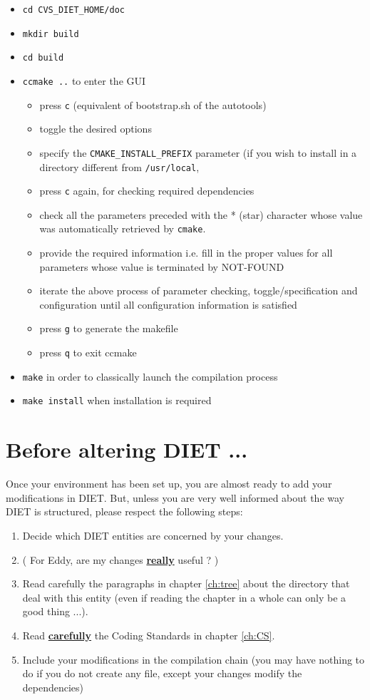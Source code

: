 \begin{itemize}
\item
  \verb+cd CVS_DIET_HOME/doc+
\item
  \verb+mkdir build+
\item
  \verb+cd build+
\item
  \verb+ccmake ..+ to enter the GUI
  \begin{itemize}
  \item press \verb+c+ (equivalent of bootstrap.sh of the autotools)
  \item toggle the desired options 
  \item specify the \verb+CMAKE_INSTALL_PREFIX+ parameter (if you wish
     to install in a directory different from \verb+/usr/local+,
  \item press \verb+c+ again, for checking required dependencies
  \item check all the parameters preceded with the * (star) character
     whose value was automatically retrieved by \verb+cmake+.
  \item provide the required information i.e. fill in the proper values
     for all parameters whose value is terminated by NOT-FOUND
  \item iterate the above process of parameter checking, toggle/specification
     and configuration until all configuration information is satisfied
  \item press \verb+g+ to generate the makefile
  \item press \verb+q+ to exit ccmake
  \end{itemize}
\item
  \verb+make+ in order to classically launch the compilation process
\item
  \verb+make install+ when installation is required
\end{itemize}


\section{Before altering DIET ...}

Once your environment has been set up, you are almost ready to add
your modifications in DIET. But, unless you are very well informed
about the way DIET is structured, please respect the following steps:
\begin{enumerate}
\item Decide which DIET entities are concerned by your changes.
\item ( For Eddy, are my changes \underline{\textbf{really}} useful ? )
\item Read carefully the paragraphs in chapter \ref{ch:tree} about the
  directory that deal with this entity (even if reading the chapter in
  a whole can only be a good thing ...).
\item Read \underline{\textbf{carefully}} the Coding Standards in
  chapter \ref{ch:CS}.
\item Include your modifications in the compilation chain (you may
  have nothing to do if you do not create any file, except your
  changes modify the dependencies)
\end{enumerate}


